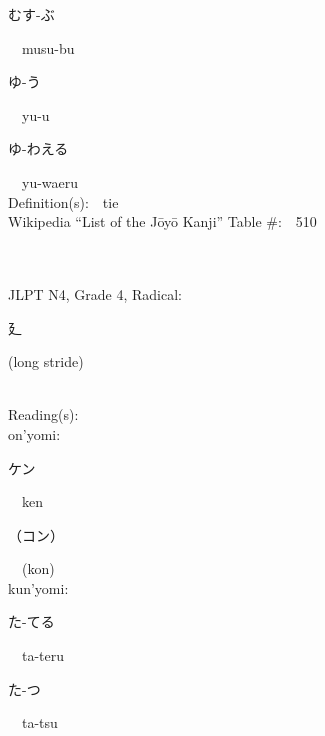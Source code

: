 \begin{multicols}{2}
{\hspace*{2em}}{\begin{CJK}{UTF8}{min} むす-ぶ \end{CJK}}\ \ musu-bu\ \ \\
{\hspace*{2em}}{\begin{CJK}{UTF8}{min} ゆ-う \end{CJK}}\ \ yu-u\ \ \\
{\hspace*{2em}}{\begin{CJK}{UTF8}{min} ゆ-わえる \end{CJK}}\ \ yu-waeru\ \ \\
Definition(s):\ \ tie \\
Wikipedia ``List of the J\=oy\=o Kanji'' Table \#:\ \ 510 \\
\ \ \\
{\fontsize{34pt}{40pt}  }\ \ \\  %
{JLPT N4, Grade 4, Radical:\ \ {\begin{CJK}{UTF8}{min} 廴 \end{CJK}} (long stride) } \\
Reading(s):\ \ \\
{\hspace*{1em}}on'yomi:\ \ \\
{\hspace*{2em}}{\begin{CJK}{UTF8}{min} ケン \end{CJK}}\ \ ken\ \ \\
{\hspace*{2em}}{\begin{CJK}{UTF8}{min} （コン） \end{CJK}}\ \ (kon)\ \ \\
{\hspace*{1em}}kun'yomi:\ \ \\
{\hspace*{2em}}{\begin{CJK}{UTF8}{min} た-てる \end{CJK}}\ \ ta-teru\ \ \\
{\hspace*{2em}}{\begin{CJK}{UTF8}{min} た-つ \end{CJK}}\ \ ta-tsu\ \ \\

\end{multicols}
